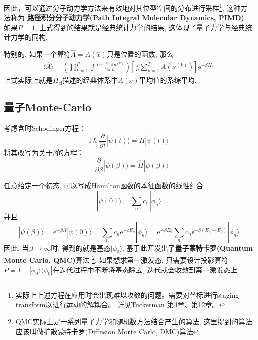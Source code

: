         因此，可以通过分子动力学方法来有效地对其位型空间的分布进行采样\footnote{
            实际上上述方程在应用时会出现难以收敛的问题。需要对坐标进行staging transform以进行运动的解耦合。
            详见Tuckerman 第4章、第12章。
        }, 这种方法称为
        \textbf{路径积分分子动力学(Path Integral Molecular Dynamics, PIMD)}. 
        如果$P=1$, 上式得到的结果就是经典统计力学的结果, 这体现了量子力学与经典统计力学的同构.

        特别的, 如果一个算符$\hat{A} = A(\hat x)$只是位置的函数, 那么
        \begin{equation}\begin{aligned}
            \langle {\hat A} \rangle = \left( \prod_{k=1}^{P} \int \frac{\mathrm{d} x^{(k)} \mathrm{d} p^{(k)}}{2\pi\hslash}  \right)  \left[ \frac1P\sum_{k=1}^{P}A(x^{(k)}) \right] \mathrm{e}^{-\beta H_\mathrm{cl}}
        \end{aligned}\end{equation}
        上式实际上就是$H_\mathrm{cl}$描述的经典体系中$A(x)$平均值的系综平均.

        \subsection{量子Monte-Carlo}

        考虑含时Schodinger方程：
        \begin{equation}
            \mathrm{i}\hslash \frac {\partial}{\partial t} | \psi(t) \rangle = \hat{H}|\psi(t) \rangle
        \end{equation}
        将其改写为关于$\beta$的方程：
        \begin{equation}
            -\frac {\partial}{\partial \beta} |\psi(\beta) \rangle = \hat{H} |\psi(\beta) \rangle
        \end{equation}

        任意给定一个初态, 可以写成Hamilton函数的本征函数的线性组合
        \begin{equation}
            |\psi(0) \rangle = \sum_n c_n |\phi_n\rangle
        \end{equation}
        并且
        \begin{equation}
            |\psi(\beta) \rangle = \mathrm{e}^{-\beta \hat{H}} |\psi(0) \rangle = \sum_n c_n\mathrm{e}^{-\beta E_n}|\phi_n \rangle 
            = \mathrm{e}^{-\beta E_0} \sum_n c_n \mathrm{e}^{-\beta(E_n-E_0)} |\phi_n \rangle
        \end{equation}
        因此, 当$\beta \to \infty$时, 得到的就是基态$|\phi_0 \rangle$. 基于此开发出了\textbf{量子蒙特卡罗(Quantum Monte Carlo, QMC)}算法
        \footnote{QMC实际上是一系列量子力学和随机数方法结合产生的算法, 这里提到的算法应该叫做扩散蒙特卡罗(Diffusion Monte Carlo, DMC)算法}. 
        如果想求第一激发态, 只需要设计投影算符$\hat P = \hat I - |\phi_0 \rangle\langle \phi_0|$在迭代过程中不断将基态除去, 迭代就会收敛到第一激发态上. 

    
    